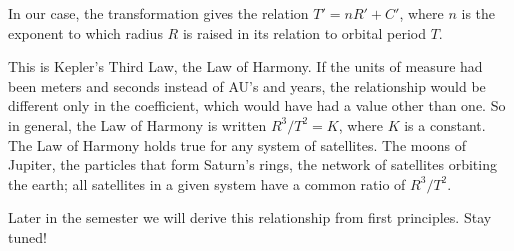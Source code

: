 \documentclass[11pt,letterpaper]{article}
\begin{document}
In our case, the transformation gives the relation $T' = nR' + C'$, where
$n$ is the exponent to which radius $R$ is raised in its relation to
orbital period $T$. 

\vspace{2cm}

This is Kepler's Third Law, the Law of Harmony. If the units of
measure had been meters and seconds instead of AU's and years, the
relationship would be different only in the coefficient, which would have had a value other than one. So in general, the
Law of Harmony is written $R^3/T^2 = K$, where $K$ is a constant. The Law of
Harmony holds true for any system of satellites. The moons of Jupiter,
the particles that form Saturn's rings, the network of satellites
orbiting the earth; all satellites in a given system have a common
ratio of $R^3/T^2$.

Later in the semester we will derive this relationship from first principles. Stay tuned!
\end{document}
